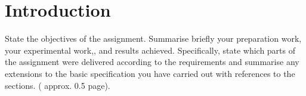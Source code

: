 
\section{Introduction}

State the objectives of the assignment. Summarise briefly your preparation work,  your experimental work,, and results achieved. Specifically, state which parts of the assignment were delivered according to the requirements and summarise any extensions to the basic specification you have carried out with references to the sections.  ( approx. 0.5 page).


